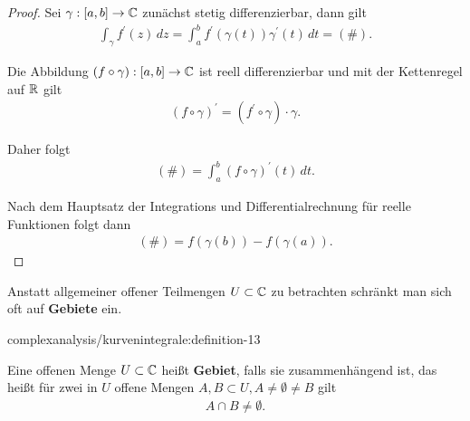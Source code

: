 \begin{proof}
 Sei \(\gamma:[a,b]\to\mathbb{C}\) zunächst stetig differenzierbar, dann gilt
\begin{align*}
\int_\gamma f^\prime(z)\, dz = \int_a^b f^\prime(\gamma(t))\gamma^\prime(t)\, dt =(\#).
\end{align*}
\par
Die Abbildung \((f\circ \gamma):[a,b]\to\mathbb{C}\) ist reell differenzierbar und mit der Kettenregel auf \(\mathbb{R}\) gilt
\begin{align*}
(f\circ\gamma)^\prime = (f^\prime\circ\gamma)\cdot\gamma.
\end{align*}
\par
Daher folgt
\begin{align*}
(\#) = \int_a^b (f\circ \gamma)^\prime(t)\, dt.
\end{align*}
\par
Nach dem Hauptsatz der Integrations und Differentialrechnung für reelle Funktionen folgt dann
\begin{align*}
(\#) = f(\gamma(b)) - f(\gamma(a)).\end{align*}\end{proof}

\par
Anstatt allgemeiner offener Teilmengen \(U\subset\mathbb{C}\) zu betrachten schränkt man sich oft auf \textbf{Gebiete} ein.
\begin{definition}{}{complexanalysis/kurvenintegrale:definition-13}



\par
Eine offenen Menge \(U\subset\mathbb{C}\) heißt \textbf{Gebiet}, falls sie zusammenhängend ist, das heißt für zwei in \(U\) offene Mengen \(A,B\subset U,A\neq\emptyset\neq B\) gilt
\begin{align*}
A\cap B \neq \emptyset.
\end{align*}\end{definition}

